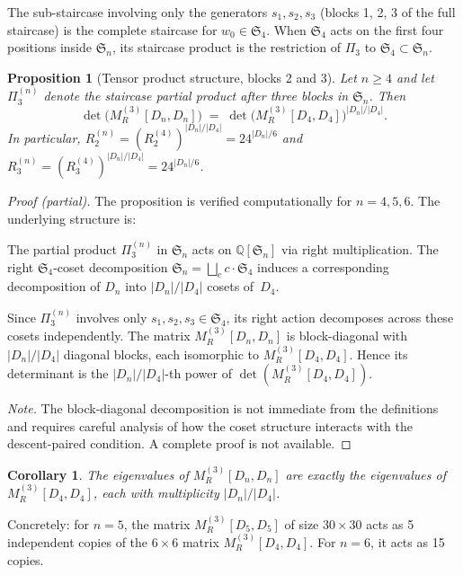 \documentclass[11pt]{article}
\newtheorem{proposition}[theorem]{Proposition}
\newtheorem{corollary}[theorem]{Corollary}
\theoremstyle{definition}
\theoremstyle{remark}
\newcommand{\QQ}{\mathbb{Q}}
\newcommand{\Sym}{\mathfrak{S}}
\begin{document}
The sub-staircase involving only the generators $s_1, s_2, s_3$
(blocks 1, 2, 3 of the full staircase) is the complete staircase for
$w_0 \in \Sym_4$.  When $\Sym_4$ acts on the first four positions
inside $\Sym_n$, its staircase product is the restriction of $\Pi_3$
to $\Sym_4 \subset \Sym_n$.

\begin{proposition}[Tensor product structure, blocks 2 and 3]\label{prop:tensor}
Let $n \ge 4$ and let $\Pi_3^{(n)}$ denote the staircase partial
product after three blocks in $\Sym_n$.  Then
\[
  \det\!\bigl(M_R^{(3)}[D_n, D_n]\bigr)
  \;=\; \det\!\bigl(M_R^{(3)}[D_4, D_4]\bigr)^{|D_n|/|D_4|}.
\]
In particular, $R_2^{(n)} = (R_2^{(4)})^{|D_n|/|D_4|} = 24^{|D_n|/6}$
and $R_3^{(n)} = (R_3^{(4)})^{|D_n|/|D_4|} = 24^{|D_n|/6}$.
\end{proposition}

\begin{proof}[Proof (partial)]
The proposition is verified computationally for $n = 4, 5, 6$.
The underlying structure is:

The partial product $\Pi_3^{(n)}$ in $\Sym_n$ acts on $\QQ[\Sym_n]$
via right multiplication.  The right $\Sym_4$-coset decomposition
$\Sym_n = \bigsqcup_c c \cdot \Sym_4$ induces a corresponding
decomposition of $D_n$ into $|D_n|/|D_4|$ cosets of~$D_4$.

Since $\Pi_3^{(n)}$ involves only $s_1, s_2, s_3 \in \Sym_4$, its
right action decomposes across these cosets independently.
The matrix $M_R^{(3)}[D_n, D_n]$ is block-diagonal with
$|D_n|/|D_4|$ diagonal blocks, each isomorphic to
$M_R^{(3)}[D_4, D_4]$.  Hence its determinant is the
$|D_n|/|D_4|$-th power of $\det(M_R^{(3)}[D_4, D_4])$.

\medskip
\noindent
\emph{Note.}  The block-diagonal decomposition is not immediate from
the definitions and requires careful analysis of how the coset
structure interacts with the descent-paired condition.
A complete proof is not available.
\end{proof}

\begin{corollary}
The eigenvalues of $M_R^{(3)}[D_n, D_n]$ are exactly the eigenvalues
of $M_R^{(3)}[D_4, D_4]$, each with multiplicity $|D_n|/|D_4|$.
\end{corollary}

\noindent
Concretely: for $n = 5$, the matrix $M_R^{(3)}[D_5, D_5]$ of size
$30 \times 30$ acts as 5 independent copies of the $6 \times 6$ matrix
$M_R^{(3)}[D_4, D_4]$.  For $n = 6$, it acts as 15 copies.
\end{document}
